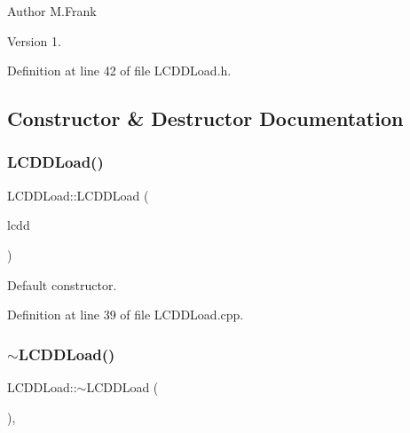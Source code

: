 \begin{DoxyAuthor}{Author}
M.\+Frank 
\end{DoxyAuthor}
\begin{DoxyVersion}{Version}
1. 
\end{DoxyVersion}


Definition at line 42 of file L\+C\+D\+D\+Load.\+h.



\subsection{Constructor \& Destructor Documentation}
\hypertarget{class_d_d4hep_1_1_l_c_d_d_load_a684443cb47baee03eb18960afe55458a}{}\label{class_d_d4hep_1_1_l_c_d_d_load_a684443cb47baee03eb18960afe55458a} 
\subsubsection{\texorpdfstring{L\+C\+D\+D\+Load()}{LCDDLoad()}}
{\footnotesize\ttfamily L\+C\+D\+D\+Load\+::\+L\+C\+D\+D\+Load (\begin{DoxyParamCaption}\item[{\hyperlink{class_d_d4hep_1_1_geometry_1_1_l_c_d_d}{Geometry\+::\+L\+C\+DD} $\ast$}]{lcdd }\end{DoxyParamCaption})\hspace{0.3cm}{\ttfamily [protected]}}



Default constructor. 



Definition at line 39 of file L\+C\+D\+D\+Load.\+cpp.

\hypertarget{class_d_d4hep_1_1_l_c_d_d_load_a8eef72df9f1cf96011f88c000690f326}{}\label{class_d_d4hep_1_1_l_c_d_d_load_a8eef72df9f1cf96011f88c000690f326} 
\subsubsection{\texorpdfstring{$\sim$\+L\+C\+D\+D\+Load()}{~LCDDLoad()}}
{\footnotesize\ttfamily L\+C\+D\+D\+Load\+::$\sim$\+L\+C\+D\+D\+Load (\begin{DoxyParamCaption}{ }\end{DoxyParamCaption})\hspace{0.3cm}{\ttfamily [protected]}, {\ttfamily [virtual]}}



